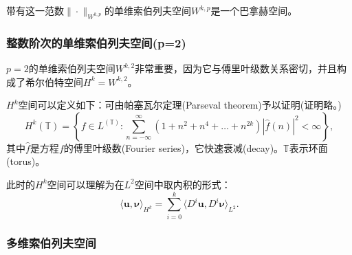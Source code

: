 带有这一范数$\| \cdot \|_{W^{k,p}}$的单维索伯列夫空间$W^{k,p}$是一个巴拿赫空间。

\subsubsection{整数阶次的单维索伯列夫空间(p=2)}
$p=2$的单维索伯列夫空间$W^{k,2}$非常重要，因为它与傅里叶级数关系密切，并且构成了希尔伯特空间$H^k = W^{k,2}$。

$H^k$空间可以定义如下：可由帕塞瓦尔定理(Parseval theorem)予以证明(证明略。)
\begin{equation*}
  H^k(\mathbb{T}) = \left\{
  f \in L^(\mathbb{T}): \sum_{n=-\infty}^{\infty} \left( 1+n^2+n^4+\ldots+n^{2k} \right) \left| \hat{f}(n) \right|^2 < \infty
  \right\},
\end{equation*}
其中$\hat{f}$是方程$f$的傅里叶级数(Fourier series)，它快速衰减(decay)。$\mathbb{T}$表示环面(torus)。

此时的$H^k$空间可以理解为在$L^2$空间中取内积的形式：
\begin{equation*}
  \langle \bm{u}, \bm{\nu} \rangle_{H^k} = \sum_{i=0}^{k} \langle D^i \bm{u}, D^i \bm{\nu} \rangle_{L^2}.
\end{equation*}

\subsubsection{多维索伯列夫空间}

